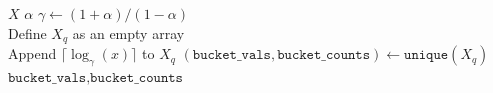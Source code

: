\begin{algorithm}
\caption{GetQuantileSketchHistogram}
\begin{algorithmic}[1]
\REQUIRE $X$ 
\REQUIRE $\alpha$ 
\STATE $\gamma \leftarrow (1 + \alpha) / (1 - \alpha)$ \\
\STATE Define $X_q$ as an empty array \\
    \STATE Append $\lceil \log_{\gamma}(x) \rceil$ to $X_q$
\ENDFOR
\STATE $(\texttt{bucket\_vals}, \texttt{bucket\_counts}) \leftarrow \texttt{unique}(X_q)$
\RETURN $\texttt{bucket\_vals}, \texttt{bucket\_counts}$
\end{algorithmic}\label{algo:quantile-sketch}
\end{algorithm}
